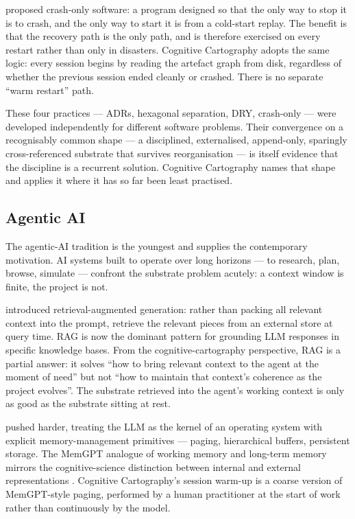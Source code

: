 \documentclass[11pt,a4paper,twocolumn]{article}
\begin{document}
\citet{candea2003crashonly} proposed crash-only software: a program
designed so that the only way to stop it is to crash, and the only
way to start it is from a cold-start replay. The benefit is that
the recovery path is the only path, and is therefore exercised on
every restart rather than only in disasters. Cognitive Cartography
adopts the same logic: every session begins by reading the artefact
graph from disk, regardless of whether the previous session ended
cleanly or crashed. There is no separate ``warm restart'' path.

These four practices --- ADRs, hexagonal separation, DRY,
crash-only --- were developed independently for different software
problems. Their convergence on a recognisably common shape --- a
disciplined, externalised, append-only, sparingly cross-referenced
substrate that survives reorganisation --- is itself evidence that
the discipline is a recurrent solution. Cognitive Cartography
names that shape and applies it where it has so far been least
practised.

\subsection{Agentic AI}

The agentic-AI tradition is the youngest and supplies the
contemporary motivation. AI systems built to operate over long
horizons --- to research, plan, browse, simulate --- confront the
substrate problem acutely: a context window is finite, the project
is not.

\citet{lewis2020rag} introduced retrieval-augmented generation: rather
than packing all relevant context into the prompt, retrieve the
relevant pieces from an external store at query time. RAG is now the
dominant pattern for grounding LLM responses in specific knowledge
bases. From the cognitive-cartography perspective, RAG is a partial
answer: it solves ``how to bring relevant context to the agent at
the moment of need'' but not ``how to maintain that context's
coherence as the project evolves''. The substrate retrieved into
the agent's working context is only as good as the substrate
sitting at rest.

\citet{packer2024memgpt} pushed harder, treating the LLM as the
kernel of an operating system with explicit memory-management
primitives --- paging, hierarchical buffers, persistent storage.
The MemGPT analogue of working memory and long-term memory mirrors
the cognitive-science distinction between internal and external
representations \citep{scaife1996external}. Cognitive Cartography's
session warm-up is a coarse version of MemGPT-style paging,
performed by a human practitioner at the start of work rather than
continuously by the model.
\end{document}
